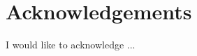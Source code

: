 
\chapter*{Acknowledgements}
\thispagestyle{plain}
\setcounter{page}{3}
I would like to acknowledge ...

\clearpage




